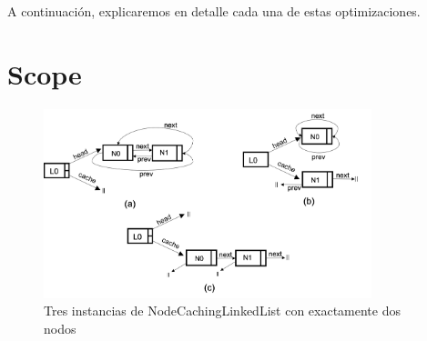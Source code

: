 

A continuación, explicaremos en detalle cada una de estas optimizaciones.

   



\section{Scope}
\label{sec:scope}

\begin{figure}[H]
    \centering
    \includegraphics[width=0.85\textwidth]{images/NCL-instances.png}
    \caption{Tres instancias de NodeCachingLinkedList con exactamente dos nodos}
    \label{fig:ncl-instances}
\end{figure}


